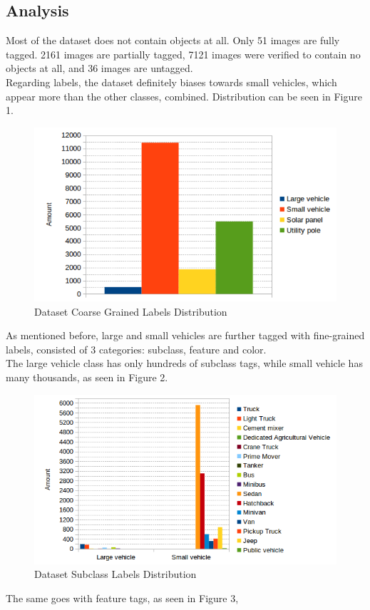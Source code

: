 \documentclass[]{article}
\begin{document}
\subsection{Analysis}
Most of the dataset does not contain objects at all. Only 51 images are fully tagged. 2161 images are partially tagged, 7121 images were verified to contain no objects at all, and 36 images are untagged.\\
Regarding labels, the dataset definitely biases towards small vehicles, which appear more than the other classes, combined. Distribution can be seen in Figure 1.
\begin{figure}[!h]
\centering
\includegraphics[width=0.7\linewidth]{"charts/Dataset Coarse Grained Labels Distribution"}
\caption{Dataset Coarse Grained Labels Distribution}
\label{fig:Dataset Coarse Grained Labels Distribution}
\end{figure}
As mentioned before, large and small vehicles are further tagged with fine-grained labels, consisted of 3 categories: subclass, feature and color.\\
The large vehicle class has only hundreds of subclass tags, while small vehicle has many thousands, as seen in Figure 2.
\begin{figure}[!h]
\centering
\includegraphics[width=0.7\linewidth]{"charts/Dataset Subclass Labels Distribution"}
\caption{Dataset Subclass Labels Distribution}
\label{fig:Dataset Subclass Labels Distribution}
\end{figure}
The same goes with feature tags, as seen in Figure 3,
\end{document}
